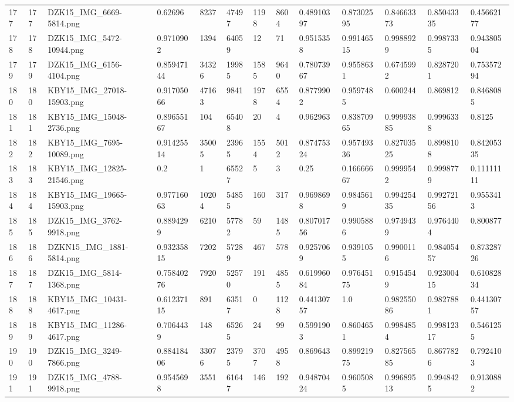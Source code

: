 \documentclass[11pt, a4paper, twoside]{report}
\begin{document}
\begin{longtable}[c]{@{}lllllllllllll@{}}
177 & 177 & DZK15\_IMG\_6669-5814.png & 0.62696 & 8237 & 47497 & 1198 & 8604 & 0.48910397 & 0.87302595 & 0.84663373 & 0.85043335 & 0.45662177 \\
178 & 178 & DZK15\_IMG\_5472-10944.png & 0.9710902 & 1394 & 64059 & 12 & 71 & 0.9515358 & 0.99146515 & 0.9988929 & 0.9987335 & 0.94380504 \\
179 & 179 & DZK15\_IMG\_6156-4104.png & 0.85947144 & 34326 & 19985 & 1585 & 9640 & 0.78073967 & 0.9558631 & 0.6745992 & 0.8287201 & 0.75357294 \\
180 & 180 & KBY15\_IMG\_27018-15903.png & 0.91705066 & 47163 & 9841 & 1978 & 6554 & 0.8779902 & 0.9597485 & 0.600244 & 0.869812 & 0.8468085 \\
181 & 181 & KBY15\_IMG\_15048-2736.png & 0.89655167 & 104 & 65408 & 20 & 4 & 0.962963 & 0.83870965 & 0.99993885 & 0.9996338 & 0.8125 \\
182 & 182 & KBY15\_IMG\_7695-10089.png & 0.91425514 & 35005 & 23965 & 1554 & 5012 & 0.87475324 & 0.95749336 & 0.82703525 & 0.8998108 & 0.84205335 \\
183 & 183 & KBY15\_IMG\_12825-21546.png & 0.2 & 1 & 65527 & 5 & 3 & 0.25 & 0.16666667 & 0.9999542 & 0.9998779 & 0.11111111 \\
184 & 184 & KBY15\_IMG\_19665-15903.png & 0.97716063 & 10204 & 54855 & 160 & 317 & 0.9698698 & 0.9845619 & 0.99425435 & 0.99272156 & 0.9553413 \\
185 & 185 & DZK15\_IMG\_3762-9918.png & 0.8894299 & 6210 & 57782 & 59 & 1485 & 0.80701756 & 0.9905886 & 0.9749439 & 0.9764404 & 0.800877 \\
186 & 186 & DZKN15\_IMG\_1881-5814.png & 0.93235815 & 7202 & 57289 & 467 & 578 & 0.9257069 & 0.9391055 & 0.9900116 & 0.98405457 & 0.87328726 \\
187 & 187 & DZK15\_IMG\_5814-1368.png & 0.75840276 & 7920 & 52570 & 191 & 4855 & 0.61996084 & 0.97645175 & 0.9154549 & 0.92300415 & 0.61082834 \\
188 & 188 & KBY15\_IMG\_10431-4617.png & 0.61237115 & 891 & 63517 & 0 & 1128 & 0.44130757 & 1.0 & 0.98255086 & 0.9827881 & 0.44130757 \\
189 & 189 & KBY15\_IMG\_11286-4617.png & 0.7064439 & 148 & 65265 & 24 & 99 & 0.5991903 & 0.8604651 & 0.9984854 & 0.99812317 & 0.5461255 \\
190 & 190 & DZK15\_IMG\_3249-7866.png & 0.88418406 & 33076 & 23795 & 3707 & 4958 & 0.869643 & 0.89921975 & 0.82756585 & 0.8677826 & 0.7924103 \\
191 & 191 & DZK15\_IMG\_4788-9918.png & 0.9545698 & 3551 & 61647 & 146 & 192 & 0.94870424 & 0.9605085 & 0.99689513 & 0.9948425 & 0.9130882 \\

\end{longtable}
\end{document}
